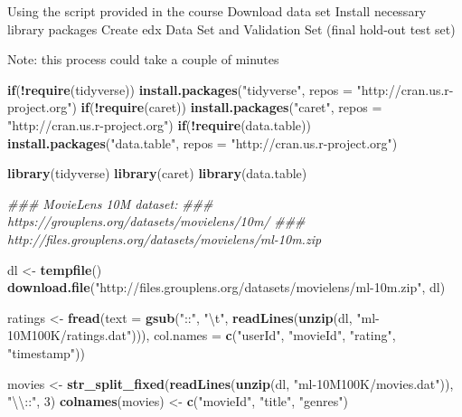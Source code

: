 \documentclass[
]{article}
\newenvironment{Shaded}{\begin{snugshade}}{\end{snugshade}}
\newcommand{\CharTok}[1]{\textcolor[rgb]{0.31,0.60,0.02}{#1}}
\newcommand{\CommentTok}[1]{\textcolor[rgb]{0.56,0.35,0.01}{\textit{#1}}}
\newcommand{\ControlFlowTok}[1]{\textcolor[rgb]{0.13,0.29,0.53}{\textbf{#1}}}
\newcommand{\DataTypeTok}[1]{\textcolor[rgb]{0.13,0.29,0.53}{#1}}
\newcommand{\DecValTok}[1]{\textcolor[rgb]{0.00,0.00,0.81}{#1}}
\newcommand{\KeywordTok}[1]{\textcolor[rgb]{0.13,0.29,0.53}{\textbf{#1}}}
\newcommand{\NormalTok}[1]{#1}
\newcommand{\OperatorTok}[1]{\textcolor[rgb]{0.81,0.36,0.00}{\textbf{#1}}}
\newcommand{\StringTok}[1]{\textcolor[rgb]{0.31,0.60,0.02}{#1}}
\begin{document}
Using the script provided in the course Download data set Install
necessary library packages Create edx Data Set and Validation Set (final
hold-out test set)

Note: this process could take a couple of minutes

\begin{Shaded}
\begin{Highlighting}[]
\ControlFlowTok{if}\NormalTok{(}\OperatorTok{!}\KeywordTok{require}\NormalTok{(tidyverse)) }\KeywordTok{install.packages}\NormalTok{(}\StringTok{"tidyverse"}\NormalTok{, }\DataTypeTok{repos =} \StringTok{"http://cran.us.r-project.org"}\NormalTok{)}
\ControlFlowTok{if}\NormalTok{(}\OperatorTok{!}\KeywordTok{require}\NormalTok{(caret)) }\KeywordTok{install.packages}\NormalTok{(}\StringTok{"caret"}\NormalTok{, }\DataTypeTok{repos =} \StringTok{"http://cran.us.r-project.org"}\NormalTok{)}
\ControlFlowTok{if}\NormalTok{(}\OperatorTok{!}\KeywordTok{require}\NormalTok{(data.table)) }\KeywordTok{install.packages}\NormalTok{(}\StringTok{"data.table"}\NormalTok{, }\DataTypeTok{repos =} \StringTok{"http://cran.us.r-project.org"}\NormalTok{)}

\KeywordTok{library}\NormalTok{(tidyverse)}
\KeywordTok{library}\NormalTok{(caret)}
\KeywordTok{library}\NormalTok{(data.table)}

\CommentTok{### MovieLens 10M dataset:}
\CommentTok{### https://grouplens.org/datasets/movielens/10m/}
\CommentTok{### http://files.grouplens.org/datasets/movielens/ml-10m.zip}

\NormalTok{dl <-}\StringTok{ }\KeywordTok{tempfile}\NormalTok{()}
\KeywordTok{download.file}\NormalTok{(}\StringTok{"http://files.grouplens.org/datasets/movielens/ml-10m.zip"}\NormalTok{, dl)}

\NormalTok{ratings <-}\StringTok{ }\KeywordTok{fread}\NormalTok{(}\DataTypeTok{text =} \KeywordTok{gsub}\NormalTok{(}\StringTok{"::"}\NormalTok{, }\StringTok{"}\CharTok{\textbackslash{}t}\StringTok{"}\NormalTok{, }\KeywordTok{readLines}\NormalTok{(}\KeywordTok{unzip}\NormalTok{(dl, }\StringTok{"ml-10M100K/ratings.dat"}\NormalTok{))),}
                 \DataTypeTok{col.names =} \KeywordTok{c}\NormalTok{(}\StringTok{"userId"}\NormalTok{, }\StringTok{"movieId"}\NormalTok{, }\StringTok{"rating"}\NormalTok{, }\StringTok{"timestamp"}\NormalTok{))}

\NormalTok{movies <-}\StringTok{ }\KeywordTok{str_split_fixed}\NormalTok{(}\KeywordTok{readLines}\NormalTok{(}\KeywordTok{unzip}\NormalTok{(dl, }\StringTok{"ml-10M100K/movies.dat"}\NormalTok{)), }\StringTok{"}\CharTok{\textbackslash{}\textbackslash{}}\StringTok{::"}\NormalTok{, }\DecValTok{3}\NormalTok{)}
\KeywordTok{colnames}\NormalTok{(movies) <-}\StringTok{ }\KeywordTok{c}\NormalTok{(}\StringTok{"movieId"}\NormalTok{, }\StringTok{"title"}\NormalTok{, }\StringTok{"genres"}\NormalTok{)}


\end{Highlighting}
\end{Shaded}
\end{document}
